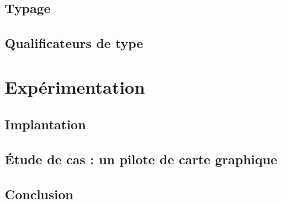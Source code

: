 \documentclass[a4paper,11pt]{memoir}
\begin{document}
\label{cha:lang}


\chapter{Typage}

\label{cha:typbase}



%

\chapter{Qualificateurs de type}

\label{cha:qualifs}



%

\part{Expérimentation}



\chapter{Implantation}

\label{cha:implem}


\chapter{Étude de cas : un pilote de carte graphique}

\label{cha:etudedecas}


\chapter{Conclusion}

\label{cha:conclusion}

\end{document}
